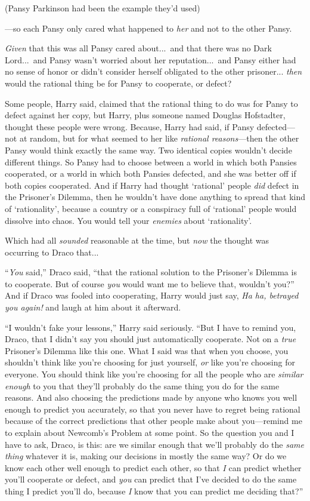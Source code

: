 (Pansy Parkinson had been the example they’d used)

—so each Pansy only cared what happened to \emph{her} and not to the other Pansy.

\emph{Given} that this was all Pansy cared about...\ and that there was no Dark Lord...\ and Pansy wasn’t worried about her reputation...\ and Pansy either had no sense of honor or didn’t consider herself obligated to the other prisoner... \emph{then} would the rational thing be for Pansy to cooperate, or defect?

Some people, Harry said, claimed that the rational thing to do was for Pansy to defect against her copy, but Harry, plus someone named Douglas Hofstadter, thought these people were wrong. Because, Harry had said, if Pansy defected—not at random, but for what seemed to her like \emph{rational reasons}—then the other Pansy would think exactly the same way. Two identical copies wouldn’t decide different things. So Pansy had to choose between a world in which both Pansies cooperated, or a world in which both Pansies defected, and she was better off if both copies cooperated. And if Harry had thought ‘rational’ people \emph{did} defect in the Prisoner’s Dilemma, then he wouldn’t have done anything to spread that kind of ‘rationality’, because a country or a conspiracy full of ‘rational’ people would dissolve into chaos. You would tell your \emph{enemies} about ‘rationality’.

Which had all \emph{sounded} reasonable at the time, but \emph{now} the thought was occurring to Draco that...

“\emph{You} said,” Draco said, “that the rational solution to the Prisoner’s Dilemma is to cooperate. But of course \emph{you} would want me to believe that, wouldn’t you?” And if Draco was fooled into cooperating, Harry would just say, \emph{Ha ha, betrayed you again!} and laugh at him about it afterward.

“I wouldn’t fake your lessons,” Harry said seriously. “But I have to remind you, Draco, that I didn’t say you should just automatically cooperate. Not on a \emph{true} Prisoner’s Dilemma like this one. What I said was that when you choose, you shouldn’t think like you’re choosing for just yourself, \emph{or} like you’re choosing for everyone. You should think like you’re choosing for all the people who are \emph{similar enough} to you that they’ll probably do the same thing you do for the same reasons. And also choosing the predictions made by anyone who knows you well enough to predict you accurately, so that you never have to regret being rational because of the correct predictions that other people make about you—remind me to explain about Newcomb’s Problem at some point. So the question you and I have to ask, Draco, is this: are we similar enough that we’ll probably do the \emph{same thing} whatever it is, making our decisions in mostly the same way? Or do we know each other well enough to predict each other, so that \emph{I} can predict whether you’ll cooperate or defect, and \emph{you} can predict that I’ve decided to do the same thing I predict you’ll do, because \emph{I} know that you can predict me deciding that?”

